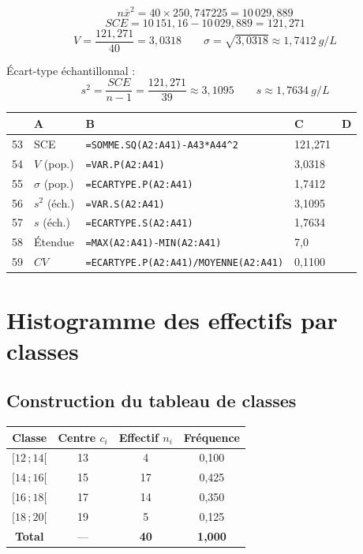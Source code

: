 \documentclass[11pt,a4paper]{article}
\newenvironment{calcsheet}[1][\footnotesize]
  {\begin{center}#1
   \begin{tabular}{|>{\columncolor{calchead}}c|l|l|l|l|}
   \hline
   \rowcolor{calchead}
   & \textbf{A} & \textbf{B} & \textbf{C} & \textbf{D} \\ \hline}
  {\end{tabular}\end{center}}
\newcommand{\fc}[1]{\textcolor{calcform}{\texttt{#1}}}
\begin{document}
\[
n\bar{x}^2 = 40 \times 250{,}747225 = 10\,029{,}889
\]
\[
SCE = 10\,151{,}16 - 10\,029{,}889 = 121{,}271
\]
\[
V = \frac{121{,}271}{40} = \boxed{3{,}0318}
\qquad
\sigma = \sqrt{3{,}0318} \approx \boxed{1{,}7412\ \si{g/L}}
\]

\noindent Écart-type échantillonnal :
\[
s^2 = \frac{SCE}{n-1} = \frac{121{,}271}{39} \approx 3{,}1095
\qquad
s \approx \boxed{1{,}7634\ \si{g/L}}
\]

\begin{calcsheet}
53 & SCE & \fc{=SOMME.SQ(A2:A41)-A43*A44\^{}2} & 121,271 & \\ \hline
54 & \( V \) (pop.) & \fc{=VAR.P(A2:A41)} & 3,0318 & \\ \hline
55 & \( \sigma \) (pop.) & \fc{=ECARTYPE.P(A2:A41)} & 1,7412 & \\ \hline
56 & \( s^2 \) (éch.) & \fc{=VAR.S(A2:A41)} & 3,1095 & \\ \hline
57 & \( s \) (éch.) & \fc{=ECARTYPE.S(A2:A41)} & 1,7634 & \\ \hline
58 & Étendue & \fc{=MAX(A2:A41)-MIN(A2:A41)} & 7,0 & \\ \hline
59 & \( CV \) & \fc{=ECARTYPE.P(A2:A41)/MOYENNE(A2:A41)} & 0,1100 & \\ \hline
\end{calcsheet}

\section{Histogramme des effectifs par classes}

\subsection{Construction du tableau de classes}

\begin{center}
\small
\begin{tabular}{|c|c|c|c|}
\hline
\rowcolor{calchead}
\textbf{Classe} & \textbf{Centre \( c_i \)} & \textbf{Effectif \( n_i \)} & \textbf{Fréquence} \\ \hline
\( [12\,;14[ \) & 13 & 4  & 0,100 \\ \hline
\( [14\,;16[ \) & 15 & 17 & 0,425 \\ \hline
\( [16\,;18[ \) & 17 & 14 & 0,350 \\ \hline
\( [18\,;20[ \) & 19 & 5  & 0,125 \\ \hline
\textbf{Total} & --- & \textbf{40} & \textbf{1,000} \\ \hline
\end{tabular}
\end{center}
\end{document}
